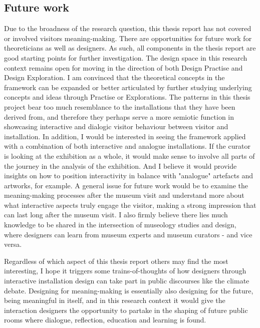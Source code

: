 \subsection{Future work}
Due to the broadness of the research question, this thesis report has not covered or involved visitors meaning-making. There are opportunities for future work for theoreticians as well as designers. As such, all components in the thesis report are good starting points for further investigation. The design space in this research context remains open for moving in the direction of both Design Practise and Design Exploration. I am convinced that the theoretical concepts in the framework can be expanded or better articulated by further studying underlying concepts and ideas through Practise or Explorations. The patterns in this thesis project bear too much resemblance to the installations that they have been derived from, and therefore they perhaps serve a more semiotic function in showcasing interactive and dialogic visitor behaviour between visitor and installation. In addition, I would be interested in seeing the framework applied with a combination of both interactive and analogue installations. If the curator is looking at the exhibition as a whole, it would make sense to involve all parts of the journey in the analysis of the exhibition. And I believe it would provide insights on how to position interactivity in balance with "analogue" artefacts and artworks, for example. A general issue for future work would be to examine the meaning-making processes after the museum visit and understand more about what interactive aspects truly engage the visitor, making a strong impression that can last long after the museum visit. I also firmly believe there lies much knowledge to be shared in the intersection of museology studies and design, where designers can learn from museum experts and museum curators - and vice versa.

Regardless of which aspect of this thesis report others may find the most interesting, I hope it triggers some trains-of-thoughts of how designers through interactive installation design can take part in public discourses like the climate debate. Designing for meaning-making is essentially also designing for the future, being meaningful in itself, and in this research context it would give the interaction designers the opportunity to partake in the shaping of future public rooms where dialogue, reflection, education and learning is found.